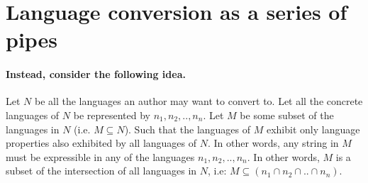 \documentclass{scrreprt}
\begin{document}




\color{black}












\section{Language conversion as a series of pipes}
\color{red}
\paragraph{Instead, consider the following idea.} Let $N$ be all the languages an author may want to convert to. Let all the concrete languages of $N$ be represented by $n_1, n_2, .., n_n$. Let $M$ be some subset of the languages in $N$ (i.e. $M \subseteq N$). Such that the languages of $M$ exhibit only language properties also exhibited by all languages of $N$. In other words, any string in $M$ must be expressible in any of the languages $n_1, n_2, .., n_n$. In other words, $M$ is a subset of the intersection of all languages in $N$, i.e: $M \subseteq (n_1 \cap n_2 \cap .. \cap n_n)$.
\end{document}
